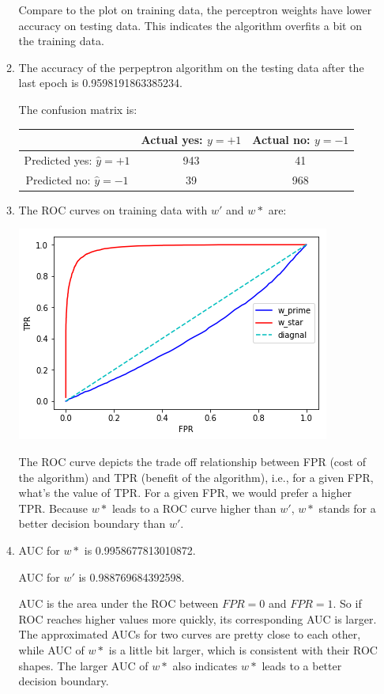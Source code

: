 \documentclass[paper=letter, fontsize=12pt]{article}
\begin{document}
\begin{enumerate}
\begin{enumerate}
	Compare to the plot on training data, the perceptron weights have lower accuracy on testing data. This indicates the algorithm overfits a bit on the training data.
	
	\item 
	The accuracy of the perpeptron algorithm on the testing data after the last epoch is 0.9598191863385234.
	
	The confusion matrix is:
	
	\begin{tabular} {|c|c|c|}
		\hline
		 & Actual yes: $y = +1$ & Actual no: $y = -1$	\\ \hline
		Predicted yes: $\hat{y} = +1$& 943 & 41 \\ \hline
		Predicted no: $\hat{y} = -1$ & 39 & 968 \\ \hline
	\end{tabular}

	\item 
	The ROC curves on training data with $w'$ and $w*$ are:
	
	\includegraphics[scale=0.5]{p2q1d.png}
	
	The ROC curve depicts the trade off relationship between FPR (cost of the algorithm) and TPR (benefit of the algorithm), i.e., for a given FPR, what's the value of TPR. For a given FPR, we would prefer a higher TPR. Because $w*$ leads to a ROC curve higher than $w'$,  $w*$ stands for a better decision boundary than $w'$.
	
	\item
	AUC for $w*$ is 0.9958677813010872.
	 
	AUC for $w'$ is 0.988769684392598.
	
	AUC is the area under the ROC between $FPR = 0$ and $FPR = 1$. So if ROC reaches higher values more quickly, its corresponding AUC is larger. The approximated AUCs for two curves are pretty close to each other, while AUC of $w*$ is a little bit larger, which is consistent with their ROC shapes. The larger AUC of $w*$ also indicates $w*$ leads to a better decision boundary.
	 

\end{enumerate}
\end{enumerate}
\end{document}
